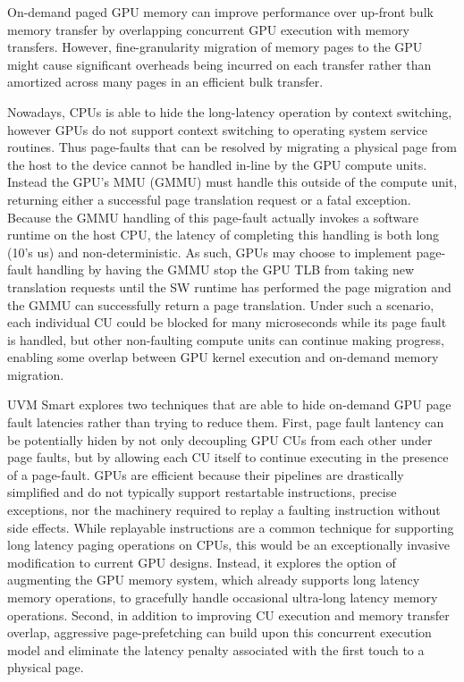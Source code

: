 On-demand paged GPU memory can improve performance over up-front bulk memory transfer by overlapping concurrent GPU execution with memory transfers. However, fine-granularity migration of memory pages to the GPU might cause significant overheads being incurred on each transfer rather than amortized across many pages in an efficient bulk transfer. 

Nowadays, CPUs is able to hide the long-latency operation by context switching, however GPUs do not support context switching to operating system service routines. Thus page-faults that can be resolved by migrating a physical page from the host to the device cannot be handled in-line by the GPU compute units. Instead the GPU’s MMU (GMMU) must handle this outside of the compute unit, returning either a successful page translation request or a fatal exception. Because the GMMU handling of this page-fault actually invokes a software runtime on the host CPU, the latency of completing this handling is both long (10’s us) and non-deterministic. As such, GPUs may choose to implement page-fault handling by having the GMMU stop the GPU TLB from taking new translation requests until the SW runtime has performed the page migration and the GMMU can successfully return a page translation. Under such a scenario, each individual CU could be blocked for many microseconds while its page fault is handled, but other non-faulting compute units can continue making progress, enabling some overlap between GPU kernel execution and on-demand memory migration.

UVM Smart \cite{9139797} explores two techniques that are able to hide on-demand GPU page fault latencies rather than trying to reduce them. First, page fault lantency can be potentially hiden by not only decoupling GPU CUs from each other under page faults, but by allowing each CU itself to continue executing in the presence of a page-fault. GPUs are efficient because their pipelines are drastically simplified and do not typically support restartable instructions, precise exceptions, nor the machinery required to replay a faulting instruction without side effects. While replayable instructions are a common technique for supporting long latency paging operations on CPUs, this would be an exceptionally invasive modification to current GPU designs. Instead, it explores the option of augmenting the GPU memory system, which already supports long latency memory operations, to gracefully handle occasional ultra-long latency memory operations. Second, in addition to improving CU execution and memory transfer overlap, aggressive page-prefetching can build upon this concurrent execution model and eliminate the latency penalty associated with the first touch to a physical page.